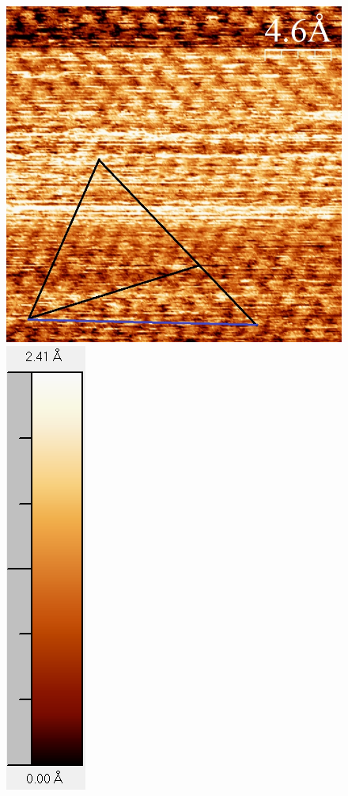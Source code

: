 \documentclass[12pt,a4paper]{article}
\begin{document}
\begin{figure}[H]
\centering
\includegraphics[scale=0.36]{Bilder/Atome/strom2_h.jpg}
\includegraphics[scale=0.64]{Bilder/Atome/strom2_scale.png}

\end{figure}
\end{document}
